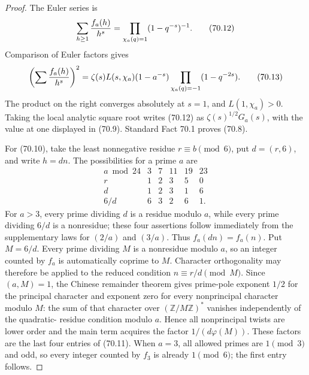 \documentclass[10pt,reqno]{amsart}
\theoremstyle{definition}
\newcommand{\1}{\mathbf 1}
\begin{document}
\begin{proof} The Euler series is
\begin{equation}
       \sum_{h\geq1}{f_a(h)\over h^s}
       =\prod_{\chi_a(q)=1}(1-q^{-s})^{-1}.                \tag{70.12}
\end{equation}
Comparison of Euler factors gives
\begin{equation}
 \left(\sum {f_a(h)\over h^s}\right)^2
 =\zeta(s)L(s,\chi_a)(1-a^{-s})
       \prod_{\chi_a(q)=-1}(1-q^{-2s}).                   \tag{70.13}
\end{equation}
The product on the right converges absolutely at $s=1$, and
$L(1,\chi_a)>0$.  Taking the local analytic square root writes (70.12) as
$\zeta(s)^{1/2}G_a(s)$, with the value at one displayed in (70.9).
Standard Fact 70.1 proves (70.8).

For (70.10), take the least nonnegative residue $r\equiv b\pmod6$, put
$d=(r,6)$, and write $h=dn$.  The possibilities for a prime $a$ are
\begin{equation}
\begin{array}{c|ccccc}
 a\bmod24&3&7&11&19&23\\ \hline
 r&1&2&3&5&0\\
 d&1&2&3&1&6\\
 6/d&6&3&2&6&1.
\end{array}                                                \tag{70.14}
\end{equation}
For $a>3$, every prime dividing $d$ is a residue modulo $a$, while
every prime dividing $6/d$ is a nonresidue; these four assertions follow
immediately from the supplementary laws for $(2/a)$ and $(3/a)$.
Thus $f_a(dn)=f_a(n)$.  Put $M=6/d$.  Every prime dividing
$M$ is a nonresidue modulo $a$, so an integer counted by $f_a$ is
automatically coprime to $M$.  Character orthogonality may therefore be
applied to the reduced condition $n\equiv r/d\pmod M$.  Since
$(a,M)=1$, the Chinese remainder theorem gives prime-pole exponent
$1/2$ for the principal character and exponent zero for every
nonprincipal character modulo $M$: the sum of that character over
$(\mathbb Z/M\mathbb Z)^*$ vanishes independently of the quadratic-
residue condition modulo $a$.  Hence all nonprincipal twists are lower
order and the main term acquires the factor
$1/(d\varphi(M))$.  These factors are the last four entries of (70.11).
When $a=3$, all allowed primes are $1\pmod3$ and odd, so every integer
counted by $f_3$ is already $1\pmod6$; the first entry follows.
\end{proof}
\end{document}

